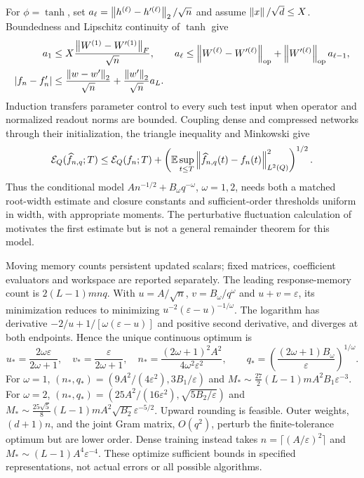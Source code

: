 For $\phi=\tanh$, set
$a_\ell=\left\lVert h^{(\ell)}-h'^{(\ell)}\right\rVert_2/\sqrt n$ and assume
$\left\lVert x\right\rVert/\sqrt d\le X$.  Boundedness and Lipschitz continuity of $\tanh$ give
\begin{align*}
 a_1&\le X\frac{\left\lVert W^{(1)}-W'^{(1)}\right\rVert_F}{\sqrt n},\qquad
 a_\ell\le\left\lVert W^{(\ell)}-W'^{(\ell)}\right\rVert_{\rm op}
             +\left\lVert W'^{(\ell)}\right\rVert_{\rm op}a_{\ell-1},\\
 |f_n-f'_n|&\le\frac{\left\lVert w-w'\right\rVert_2}{\sqrt n}
                    +\frac{\left\lVert w'\right\rVert_2}{\sqrt n}a_L.
\end{align*}
Induction transfers parameter control to every such test input when operator
and normalized readout norms are bounded.  Coupling dense and compressed
networks through their initialization, the triangle inequality and Minkowski give
\begin{equation}
 \mathcal E_Q(\widehat f_{n,q};T)
 \le\mathcal E_Q(f_n;T)
 +\left(\mathbb{E}\sup_{t\le T}\left\lVert \widehat f_{n,q}(t)-f_n(t)\right\rVert_{L^2(Q)}^2\right)^{1/2}.
 \label{cmp:triangle}
\end{equation}
Thus the conditional model $A n^{-1/2}+B_\omega q^{-\omega}$, $\omega=1,2$, needs both a
matched root-width estimate and closure constants and sufficient-order
thresholds uniform in width, with appropriate moments.  The perturbative
fluctuation calculation of \citet{bordelon2023finite} motivates the first
estimate but is not a general remainder theorem for this model.

Moving memory counts persistent updated scalars; fixed matrices, coefficient
evaluators and workspace are reported separately.  The leading response-memory
count is $2(L-1)mnq$.  With $u=A/\sqrt n$, $v=B_\omega/q^\omega$ and $u+v=\varepsilon$,
its minimization reduces to minimizing $u^{-2}(\varepsilon-u)^{-1/\omega}$.
The logarithm has derivative $-2/u+1/[\omega(\varepsilon-u)]$ and positive second
derivative, and diverges at both endpoints.  Hence the unique continuous optimum is
\begin{equation}
 u_*=\frac{2\omega\varepsilon}{2\omega+1},\quad v_*=\frac{\varepsilon}{2\omega+1},\quad
 n_*=\frac{(2\omega+1)^2A^2}{4\omega^2\varepsilon^2},\qquad
 q_* =\left(\frac{(2\omega+1)B_\omega}{\varepsilon}\right)^{1/\omega}.
 \label{cmp:allocation}
\end{equation}
For $\omega=1$, $(n_*,q_*)=(9A^2/(4\varepsilon^2),3B_1/\varepsilon)$ and
$M_*\sim\tfrac{27}{2}(L-1)mA^2B_1\varepsilon^{-3}$.
For $\omega=2$, $(n_*,q_*)=(25A^2/(16\varepsilon^2),\sqrt{5B_2/\varepsilon})$ and
$M_*\sim\tfrac{25\sqrt5}{8}(L-1)mA^2\sqrt{B_2}\varepsilon^{-5/2}$.
Upward rounding is feasible.  Outer weights, $(d+1)n$, and the joint Gram
matrix, $O(q^2)$, perturb the finite-tolerance optimum but are lower order.
Dense training instead takes $n=\lceil(A/\varepsilon)^2\rceil$ and
$M_*\sim(L-1)A^4\varepsilon^{-4}$.  These optimize sufficient bounds in
specified representations, not actual errors or all possible algorithms.

